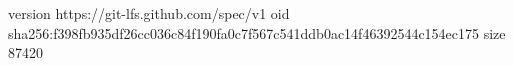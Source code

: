 version https://git-lfs.github.com/spec/v1
oid sha256:f398fb935df26cc036c84f190fa0c7f567c541ddb0ac14f46392544c154ec175
size 87420
